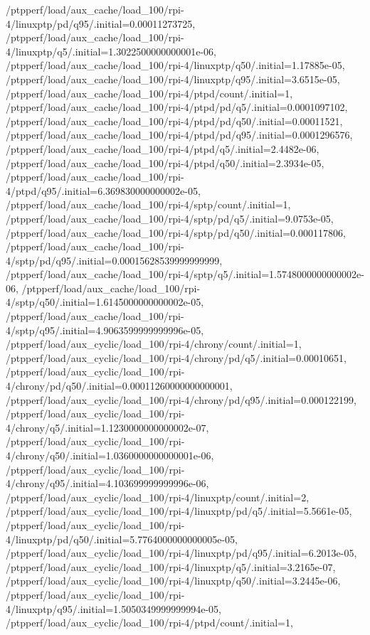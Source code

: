 {    /ptpperf/load/aux_cache/load_100/rpi-4/linuxptp/pd/q95/.initial=0.00011273725,
    /ptpperf/load/aux_cache/load_100/rpi-4/linuxptp/q5/.initial=1.3022500000000001e-06,
    /ptpperf/load/aux_cache/load_100/rpi-4/linuxptp/q50/.initial=1.17885e-05,
    /ptpperf/load/aux_cache/load_100/rpi-4/linuxptp/q95/.initial=3.6515e-05,
    /ptpperf/load/aux_cache/load_100/rpi-4/ptpd/count/.initial=1,
    /ptpperf/load/aux_cache/load_100/rpi-4/ptpd/pd/q5/.initial=0.0001097102,
    /ptpperf/load/aux_cache/load_100/rpi-4/ptpd/pd/q50/.initial=0.00011521,
    /ptpperf/load/aux_cache/load_100/rpi-4/ptpd/pd/q95/.initial=0.0001296576,
    /ptpperf/load/aux_cache/load_100/rpi-4/ptpd/q5/.initial=2.4482e-06,
    /ptpperf/load/aux_cache/load_100/rpi-4/ptpd/q50/.initial=2.3934e-05,
    /ptpperf/load/aux_cache/load_100/rpi-4/ptpd/q95/.initial=6.369830000000002e-05,
    /ptpperf/load/aux_cache/load_100/rpi-4/sptp/count/.initial=1,
    /ptpperf/load/aux_cache/load_100/rpi-4/sptp/pd/q5/.initial=9.0753e-05,
    /ptpperf/load/aux_cache/load_100/rpi-4/sptp/pd/q50/.initial=0.000117806,
    /ptpperf/load/aux_cache/load_100/rpi-4/sptp/pd/q95/.initial=0.00015628539999999999,
    /ptpperf/load/aux_cache/load_100/rpi-4/sptp/q5/.initial=1.5748000000000002e-06,
    /ptpperf/load/aux_cache/load_100/rpi-4/sptp/q50/.initial=1.6145000000000002e-05,
    /ptpperf/load/aux_cache/load_100/rpi-4/sptp/q95/.initial=4.9063599999999996e-05,
    /ptpperf/load/aux_cyclic/load_100/rpi-4/chrony/count/.initial=1,
    /ptpperf/load/aux_cyclic/load_100/rpi-4/chrony/pd/q5/.initial=0.00010651,
    /ptpperf/load/aux_cyclic/load_100/rpi-4/chrony/pd/q50/.initial=0.00011260000000000001,
    /ptpperf/load/aux_cyclic/load_100/rpi-4/chrony/pd/q95/.initial=0.000122199,
    /ptpperf/load/aux_cyclic/load_100/rpi-4/chrony/q5/.initial=1.1230000000000002e-07,
    /ptpperf/load/aux_cyclic/load_100/rpi-4/chrony/q50/.initial=1.0360000000000001e-06,
    /ptpperf/load/aux_cyclic/load_100/rpi-4/chrony/q95/.initial=4.103699999999996e-06,
    /ptpperf/load/aux_cyclic/load_100/rpi-4/linuxptp/count/.initial=2,
    /ptpperf/load/aux_cyclic/load_100/rpi-4/linuxptp/pd/q5/.initial=5.5661e-05,
    /ptpperf/load/aux_cyclic/load_100/rpi-4/linuxptp/pd/q50/.initial=5.7764000000000005e-05,
    /ptpperf/load/aux_cyclic/load_100/rpi-4/linuxptp/pd/q95/.initial=6.2013e-05,
    /ptpperf/load/aux_cyclic/load_100/rpi-4/linuxptp/q5/.initial=3.2165e-07,
    /ptpperf/load/aux_cyclic/load_100/rpi-4/linuxptp/q50/.initial=3.2445e-06,
    /ptpperf/load/aux_cyclic/load_100/rpi-4/linuxptp/q95/.initial=1.5050349999999994e-05,
    /ptpperf/load/aux_cyclic/load_100/rpi-4/ptpd/count/.initial=1,
}
